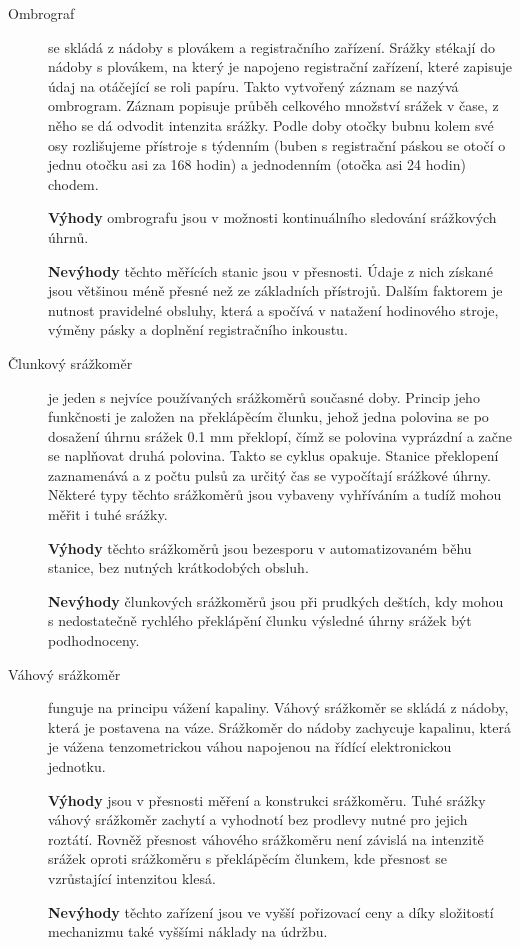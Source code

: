 \documentclass[a4paper,12pt]{article}
\begin{document}
\begin{description} 
\item[Ombrograf]se skládá z nádoby s plovákem a registračního zařízení. Srážky stékají do nádoby s plovákem, na který je napojeno registrační zařízení, které zapisuje údaj na otáčející se roli papíru. Takto vytvořený záznam se nazývá ombrogram. Záznam popisuje průběh celkového množství srážek v čase, z něho se dá odvodit intenzita srážky. Podle doby otočky bubnu kolem své osy rozlišujeme přístroje s týdenním (buben s registrační páskou se otočí o jednu otočku asi za 168 hodin) a jednodenním (otočka asi 24 hodin) chodem.\cite{chmu_navod}

\textbf{Výhody} ombrografu jsou v možnosti kontinuálního sledování srážkových úhrnů.

\textbf{Nevýhody} těchto měřících stanic jsou v přesnosti. Údaje z nich získané jsou většinou méně přesné než ze základních přístrojů. Dalším faktorem je nutnost pravidelné obsluhy, která a spočívá v natažení hodinového stroje, výměny pásky a doplnění registračního inkoustu.
\end{description}

\begin{description} 
\item[Člunkový srážkoměr] je jeden s nejvíce používaných srážkoměrů současné doby. Princip jeho funkčnosti je založen na překlápěcím člunku, jehož jedna polovina se po dosažení úhrnu srážek 0.1 mm překlopí, čímž se polovina vyprázdní a začne se naplňovat druhá polovina. Takto se cyklus opakuje. Stanice překlopení zaznamenává a z počtu pulsů za určitý čas se vypočítají srážkové úhrny. Některé typy těchto srážkoměrů jsou vybaveny vyhříváním a tudíž mohou měřit i tuhé srážky.

\textbf{Výhody} těchto srážkoměrů jsou bezesporu v automatizovaném běhu stanice, bez nutných krátkodobých obsluh. 

\textbf{Nevýhody} člunkových srážkoměrů jsou při prudkých deštích, kdy mohou s nedostatečně rychlého překlápění člunku výsledné úhrny srážek být podhodnoceny.\cite{sevruk}
\end{description}

\begin{description} 
\item[Váhový srážkoměr] funguje na principu vážení kapaliny. Váhový srážkoměr se skládá z nádoby, která je postavena na váze. Srážkoměr do nádoby zachycuje kapalinu, která je vážena tenzometrickou váhou napojenou na řídící elektronickou jednotku.

\textbf{Výhody} jsou v přesnosti měření a konstrukci srážkoměru. Tuhé srážky váhový srážkoměr zachytí a vyhodnotí bez prodlevy nutné pro jejich roztátí. Rovněž přesnost váhového srážkoměru není závislá na intenzitě srážek oproti srážkoměru s překlápěcím člunkem, kde přesnost se vzrůstající intenzitou klesá.

\textbf{Nevýhody} těchto zařízení jsou ve vyšší pořizovací ceny a díky složitostí mechanizmu také vyššími náklady na údržbu.
\end{description}
\end{document}
